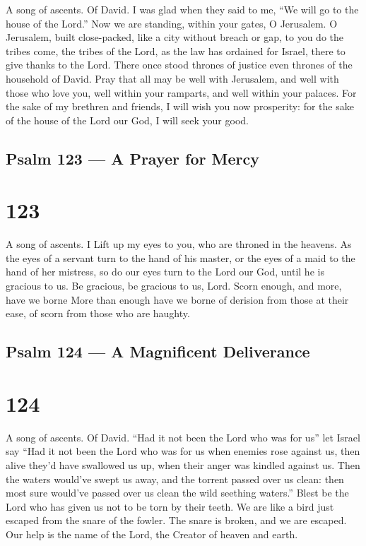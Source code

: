 A song of ascents. Of David.  I was glad when they said to
me, ``We will go to the house of the Lord.''  Now we are
standing, within your gates, O Jerusalem.  O Jerusalem,
built close-packed, like a city without breach or gap,  to
you do the tribes come, the tribes of the Lord, as the law has ordained
for Israel, there to give thanks to the Lord.  There once
stood thrones of justice even thrones of the household of David.
 Pray that all may be well with Jerusalem, and well with
those who love you,  well within your ramparts, and well
within your palaces.  For the sake of my brethren and
friends, I will wish you now prosperity:  for the sake of
the house of the Lord our God, I will seek your good.

\hypertarget{psalm-123-a-prayer-for-mercy}{%
\subsection{Psalm 123 --- A Prayer for
Mercy}\label{psalm-123-a-prayer-for-mercy}}

\hypertarget{section-122}{%
\section{123}\label{section-122}}

A song of ascents.  I Lift up my eyes to you, who are
throned in the heavens.  As the eyes of a servant turn to
the hand of his master, or the eyes of a maid to the hand of her
mistress, so do our eyes turn to the Lord our God, until he is gracious
to us.  Be gracious, be gracious to us, Lord. Scorn enough,
and more, have we borne  More than enough have we borne of
derision from those at their ease, of scorn from those who are haughty.

\hypertarget{psalm-124-a-magnificent-deliverance}{%
\subsection{Psalm 124 --- A Magnificent
Deliverance}\label{psalm-124-a-magnificent-deliverance}}

\hypertarget{section-123}{%
\section{124}\label{section-123}}

A song of ascents. Of David.  ``Had it not been the Lord who
was for us'' let Israel say  ``Had it not been the Lord who
was for us when enemies rose against us,  then alive they'd
have swallowed us up, when their anger was kindled against us.
 Then the waters would've swept us away, and the torrent
passed over us clean:  then most sure would've passed over
us clean the wild seething waters.''  Blest be the Lord who
has given us not to be torn by their teeth.  We are like a
bird just escaped from the snare of the fowler. The snare is broken, and
we are escaped.  Our help is the name of the Lord, the
Creator of heaven and earth.

